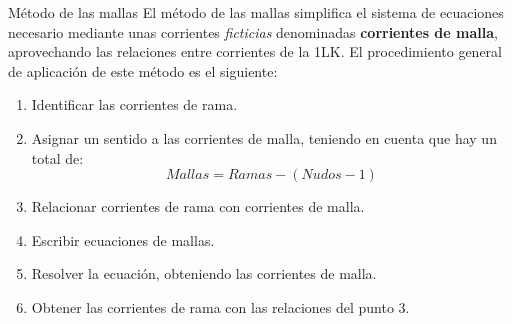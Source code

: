 \documentclass[11pt]{book} %
\makeatletter
\numberwithin{dummy}{section}
\theoremstyle{ocrenumbox}
\theoremstyle{blacknumex}
\theoremstyle{blacknumbox}
\theoremstyle{ocrenum}
\renewcommand{\subsection}{\@startsection {subsection}{2}{\z@}
{-3ex \@plus -0.1ex \@minus -.4ex}
{0.5ex \@plus.2ex }
{\normalfont\sffamily\bfseries}}
\makeatother
\begin{document}
	\subsection{Método de las mallas}
	El método de las mallas simplifica el sistema de ecuaciones necesario mediante unas corrientes \emph{ficticias} denominadas \textbf{corrientes de malla}, aprovechando las relaciones entre corrientes de la 1LK. El procedimiento general de aplicación de este método es el siguiente:
	\begin{enumerate}
		\item Identificar las corrientes de rama.
		\item Asignar un sentido a las corrientes de malla, teniendo en cuenta que hay un total de:
		\begin{equation}
			\boxed{Mallas=Ramas-(Nudos-1)}
		\end{equation}
		\item Relacionar corrientes de rama con corrientes de malla.
		\item Escribir ecuaciones de mallas.
		\item Resolver la ecuación, obteniendo las corrientes de malla.
		\item Obtener las corrientes de rama con las relaciones del punto 3.
	\end{enumerate}
	
\end{document}
